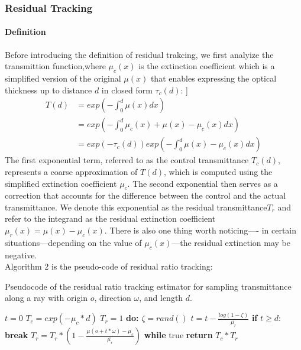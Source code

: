 \documentclass[acmtog]{acmart}
\begin{document}
\subsubsection{Residual Tracking}
\paragraph {\textbf{Definition}}
Before introducing the definition of residual trakcing, we first analyize the transmittion function,where $\mu_c(x)$ is the extinction coefficient which is a simplified version of the original $\mu(x)$ that enables expressing the optical thickness up to distance $d$ in closed form $\tau_c(d)$:
]\begin{equation}
	\begin{aligned}
		T(d)&=exp(-\int_{0}^{d}\mu(x)dx)\\
		&=exp(-\int_{0}^{d}\mu_c(x)+\mu(x)-\mu_c(x)dx)\\
		&=exp(-\tau_c(d)) exp(-\int_0^d\mu(x)-\mu_c(x)dx)
	\end{aligned}
\end{equation}
The first exponential term, referred to as the control transmittance $T_c(d)$, represents a coarse approximation of $T(d)$, which is computed using the simplified extinction coefficient $\mu_c$. The second exponential then serves as a correction that accounts for the difference between the control and the actual transmittance. We denote
this exponential as the residual transmittance$ T_r$ and refer to the integrand as the residual extinction coefficient $\mu_r(x) = \mu(x)-\mu_c(x)$.
There is also one thing worth noticing---- in certain situations—depending on the value of $\mu_c(x)$—the residual extinction may be negative.
\\Algorithm 2 is the pseudo-code of residual ratio tracking:
\begin{algorithm}[h]
	\caption{Pseudocode of the residual ratio tracking estimator for sampling transmittance along a ray with origin $o$, direction $\omega$, and length $d$.}
	\begin{algorithmic}[1]
		\State $t=0$
		\State $T_c=exp(-\mu_c*d)$
		\State $T_r=1$
		\State \textbf{do:}
		\State  \qquad$\zeta=rand() $
		\State  \qquad$t=t-\frac{log(1-\zeta)}{\bar{\mu_r}} $
		\State  \qquad\textbf{if} $t\geq d:$ \textbf{break}
		\State  \qquad$T_r = T_r *(1-\frac{\mu(o+t*\omega)-\mu_c}{\bar{\mu_r}}) $
		\State \textbf{while} true
		\State \textbf{return} $T_c*T_r$
		\EndFunction  
	\end{algorithmic}
\end{algorithm}\\
\end{document}
